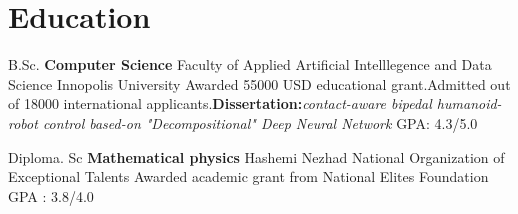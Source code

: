 \section{Education}
            {B.Sc. \textbf{Computer Science}}
            {Faculty of Applied Artificial Intelllegence and Data Science}
            {Innopolis University}
            {Awarded 55000 USD educational grant.Admitted out of 18000 international applicants.\textbf{Dissertation:}\textit{contact-aware bipedal humanoid-robot control based-on "Decompositional" Deep Neural Network} }
            {GPA: 4.3/5.0} 
  
    \vspace{10pt}
    
            {Diploma. Sc \textbf{Mathematical physics}}
            {Hashemi Nezhad}
            {National Organization of Exceptional Talents}
            {Awarded academic grant from National Elites Foundation }
            {GPA : 3.8/4.0}